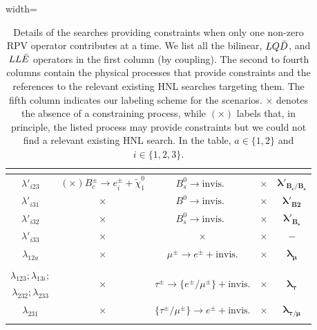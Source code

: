 \begin{table}[!ht]
\begin{adjustbox}{width=\columnwidth}
\begin{tabular}{|c|c|c|c|c|}
&&& \cite{Ballett:2019bgd, Kling:2018wct, DeVries:2020jbs, Beltran:2023nli} &\\[0.15cm]
\hline
$\lambda'_{i23}$ & $\left(\bm{\times}\right) B_c^\pm\to e^\pm_i + \tilde{\chi}^0_1$ & $B_s^0\to \text{invis.}$~\cite{ParticleDataGroup:2022pth} & $\bm{\times}$ & $\bm{\lambda'_{B_c/B_s}}$\\[0.15 cm]
\hline
$\lambda'_{i31}$ & $\bm{\times}$ & $B^0\to \text{invis.}$~\cite{BaBar:2012yut} & $\bm{\times}$ & $\bm{\lambda'_{B2}}$\\[0.15 cm]
\hline
$\lambda'_{i32}$ & $\bm{\times}$ & $B^0_s\to \text{invis.}$~\cite{ParticleDataGroup:2022pth} & $\bm{\times}$ & $\bm{\lambda'_{B_s}}$\\[0.15 cm]
\hline
$\lambda'_{i33}$ & $\bm{\times}$ & $\bm{\times}$ & $\bm{\times}$ & $\bm{-}$\\[0.15 cm]
\hline
$\lambda_{12a}$ & $\bm{\times}$ & $\mu^\pm \to e^\pm + \text{invis.}$
& $\bm{\times}$ & $\bm{\lambda_{\mu}}$\\[0.15 cm]
&&\cite{ParticleDataGroup:2022pth}&& \\
\hline
$\lambda_{123}; \lambda_{13i};$ & \multirow{2}{*}{$\bm{\times}$} & \multirow{2}{*}{$\tau^\pm \to \{e^\pm/\mu^\pm\} + \text{invis.}$}
& \multirow{2}{*}{$\bm{\times}$} & \multirow{2}{*}{$\bm{\lambda_{\tau}}$}\\[0.21 cm]
$\lambda_{232}; \lambda_{233}$ & & \cite{ParticleDataGroup:2022pth} & &\\[0.15 cm]
\hline
$\lambda_{231}$ & $\bm{\times}$ & $\{\tau^\pm/\mu^\pm\} \to e^\pm + \text{invis.}$
& $\bm{\times}$ & $\bm{\lambda_{\tau/\mu}}$\\[0.15 cm]
&&\cite{ParticleDataGroup:2022pth}&& \\
\hline
\end{tabular}
\end{adjustbox}
\caption{Details of the searches providing constraints when only one non-zero RPV operator contributes
at a time. We list all the bilinear, $LQ\Bar{D}$, and $LL\Bar{E}$ operators in the first column (by coupling).
The second to fourth columns contain the physical processes that provide constraints and the references to the relevant 
existing HNL searches targeting them. The fifth column indicates our labeling scheme for the scenarios.
$\bm{\times}$ denotes the absence of a constraining process, while $\left(\bm{\times}\right)$ labels that, 
in principle, the listed process may provide constraints but we could not find a relevant existing HNL search.
In the table, $a\in\{1,2\}$ and $i\in\{1,2,3\}$.}
\label{tab:single_couplings_BMs}
\end{table}


